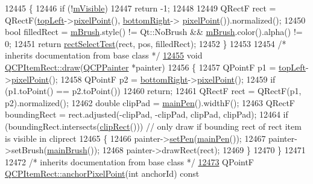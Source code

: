 \begin{DoxyCode}
12445 \textcolor{keyword}{}\{
12446   \textcolor{keywordflow}{if} (!\hyperlink{a00044_a62e3aed8427d6ce3ccf716f285106cb3}{mVisible})
12447     \textcolor{keywordflow}{return} -1;
12448   
12449   QRectF rect = QRectF(\hyperlink{a00039_aa70feeef173489b03c3fbe906a5023c4}{topLeft}->\hyperlink{a00038_ae490f9c76ee2ba33752c495d3b6e8fb5}{pixelPoint}(), \hyperlink{a00039_a409f3bfe615a7e322bb3d4d193d85b26}{bottomRight}->
      \hyperlink{a00038_ae490f9c76ee2ba33752c495d3b6e8fb5}{pixelPoint}()).normalized();
12450   \textcolor{keywordtype}{bool} filledRect = \hyperlink{a00039_a2d7f207fada27588b3a52b19234d3c2e}{mBrush}.style() != Qt::NoBrush && \hyperlink{a00039_a2d7f207fada27588b3a52b19234d3c2e}{mBrush}.color().alpha() != 0;
12451   \textcolor{keywordflow}{return} \hyperlink{a00022_a4c0e14c4e92df91174cb7183fb363069}{rectSelectTest}(rect, pos, filledRect);
12452 \}
12453 
12454 \textcolor{comment}{/* inherits documentation from base class */}
\hypertarget{a00115_source_l12455}{}\hyperlink{a00039_a18cd583638b876cdd50f1a155ec182aa}{12455} \textcolor{keywordtype}{void} \hyperlink{a00039_a18cd583638b876cdd50f1a155ec182aa}{QCPItemRect::draw}(\hyperlink{a00047}{QCPPainter} *painter)
12456 \{
12457   QPointF p1 = \hyperlink{a00039_aa70feeef173489b03c3fbe906a5023c4}{topLeft}->\hyperlink{a00038_ae490f9c76ee2ba33752c495d3b6e8fb5}{pixelPoint}();
12458   QPointF p2 = \hyperlink{a00039_a409f3bfe615a7e322bb3d4d193d85b26}{bottomRight}->\hyperlink{a00038_ae490f9c76ee2ba33752c495d3b6e8fb5}{pixelPoint}();
12459   \textcolor{keywordflow}{if} (p1.toPoint() == p2.toPoint())
12460     \textcolor{keywordflow}{return};
12461   QRectF rect = QRectF(p1, p2).normalized();
12462   \textcolor{keywordtype}{double} clipPad = \hyperlink{a00039_afa0fb7c6328a1e197ecd537de36daf8f}{mainPen}().widthF();
12463   QRectF boundingRect = rect.adjusted(-clipPad, -clipPad, clipPad, clipPad);
12464   \textcolor{keywordflow}{if} (boundingRect.intersects(\hyperlink{a00022_a538e25ff8856534582f5b2b400a46405}{clipRect}())) \textcolor{comment}{// only draw if bounding rect of rect item is visible in
       cliprect}
12465   \{
12466     painter->\hyperlink{a00047_af9c7a4cd1791403901f8c5b82a150195}{setPen}(\hyperlink{a00039_afa0fb7c6328a1e197ecd537de36daf8f}{mainPen}());
12467     painter->setBrush(\hyperlink{a00039_ab0bd8e272e822ec851ba5b0c20e9200e}{mainBrush}());
12468     painter->drawRect(rect);
12469   \}
12470 \}
12471 
12472 \textcolor{comment}{/* inherits documentation from base class */}
\hypertarget{a00115_source_l12473}{}\hyperlink{a00039_ae0973f8281fb52361b0c99ee899be07e}{12473} QPointF \hyperlink{a00039_ae0973f8281fb52361b0c99ee899be07e}{QCPItemRect::anchorPixelPoint}(\textcolor{keywordtype}{int} anchorId)\textcolor{keyword}{ const}

\end{DoxyCode}
